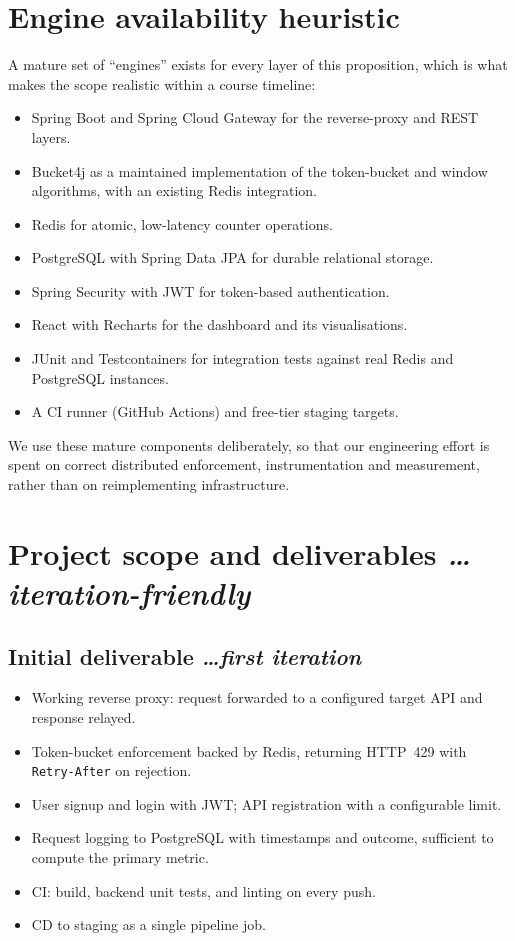 \documentclass[11pt,a4paper]{article}
\newcommand{\BvrHint}[1]{%
  {\normalfont\normalsize\itshape\hfill #1}}
\begin{document}
\section{Engine availability heuristic}
A mature set of ``engines'' exists for every layer of this proposition, which
is what makes the scope realistic within a course timeline:
\begin{itemize}[leftmargin=0.7cm]
    \item Spring Boot and Spring Cloud Gateway for the reverse-proxy and REST
      layers.
    \item Bucket4j as a maintained implementation of the token-bucket and
      window algorithms, with an existing Redis integration.
    \item Redis for atomic, low-latency counter operations.
    \item PostgreSQL with Spring Data JPA for durable relational storage.
    \item Spring Security with JWT for token-based authentication.
    \item React with Recharts for the dashboard and its visualisations.
    \item JUnit and Testcontainers for integration tests against real Redis and
      PostgreSQL instances.
    \item A CI runner (GitHub Actions) and free-tier staging targets.
\end{itemize}
We use these mature components deliberately, so that our engineering effort is
spent on correct distributed enforcement, instrumentation and measurement,
rather than on reimplementing infrastructure.

\section{Project scope and deliverables %
\BvrHint{\ldots iteration-friendly}}
\subsection{Initial deliverable %
\BvrHint{\ldots first iteration}}
\begin{itemize}[leftmargin=0.7cm]
    \item Working reverse proxy: request forwarded to a configured target API
      and response relayed.
    \item Token-bucket enforcement backed by Redis, returning HTTP~429 with
      \texttt{Retry-After} on rejection.
    \item User signup and login with JWT; API registration with a configurable
      limit.
    \item Request logging to PostgreSQL with timestamps and outcome, sufficient
      to compute the primary metric.
    \item CI: build, backend unit tests, and linting on every push.
    \item CD to staging as a single pipeline job.
\end{itemize}
\end{document}
